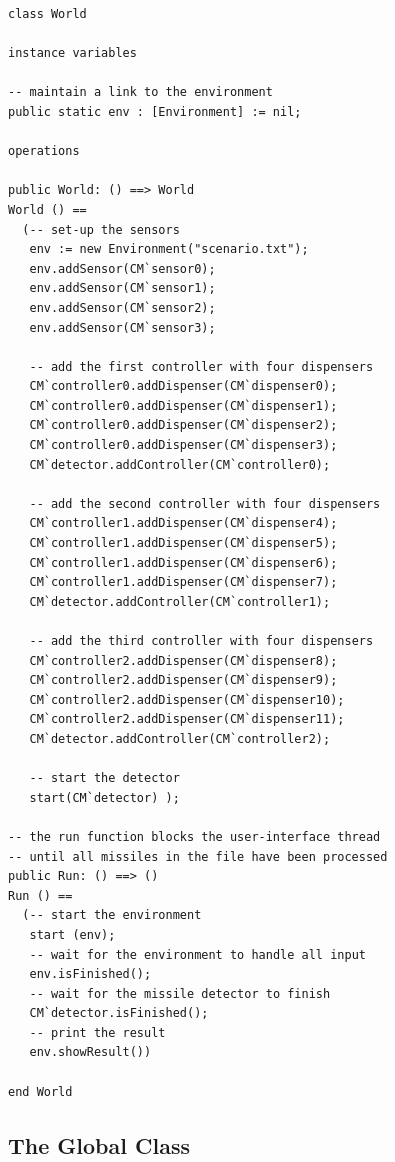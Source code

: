 \documentclass{overturerepchap}
\begin{document}
\begin{lstlisting}
class World

instance variables

-- maintain a link to the environment
public static env : [Environment] := nil;

operations

public World: () ==> World
World () ==
  (-- set-up the sensors
   env := new Environment("scenario.txt");
   env.addSensor(CM`sensor0);
   env.addSensor(CM`sensor1);
   env.addSensor(CM`sensor2);
   env.addSensor(CM`sensor3);

   -- add the first controller with four dispensers
   CM`controller0.addDispenser(CM`dispenser0);
   CM`controller0.addDispenser(CM`dispenser1);
   CM`controller0.addDispenser(CM`dispenser2);
   CM`controller0.addDispenser(CM`dispenser3);
   CM`detector.addController(CM`controller0);

   -- add the second controller with four dispensers
   CM`controller1.addDispenser(CM`dispenser4);
   CM`controller1.addDispenser(CM`dispenser5);
   CM`controller1.addDispenser(CM`dispenser6);
   CM`controller1.addDispenser(CM`dispenser7);
   CM`detector.addController(CM`controller1);
 
   -- add the third controller with four dispensers
   CM`controller2.addDispenser(CM`dispenser8);
   CM`controller2.addDispenser(CM`dispenser9);
   CM`controller2.addDispenser(CM`dispenser10);
   CM`controller2.addDispenser(CM`dispenser11);
   CM`detector.addController(CM`controller2);
      
   -- start the detector
   start(CM`detector) );

-- the run function blocks the user-interface thread
-- until all missiles in the file have been processed
public Run: () ==> ()
Run () == 
  (-- start the environment
   start (env);
   -- wait for the environment to handle all input
   env.isFinished();
   -- wait for the missile detector to finish
   CM`detector.isFinished();
   -- print the result
   env.showResult())

end World
\end{lstlisting}

\subsection{The Global Class}
\end{document}
